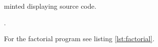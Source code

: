\documentclass[a4paper, 12pt]{article}
\begin{document}
\begin{listing}
	\caption{minted displaying source code.}.
	\label{lst:factorial}
\end{listing}
For the factorial program see listing \ref{lst:factorial}.
\end{document}
